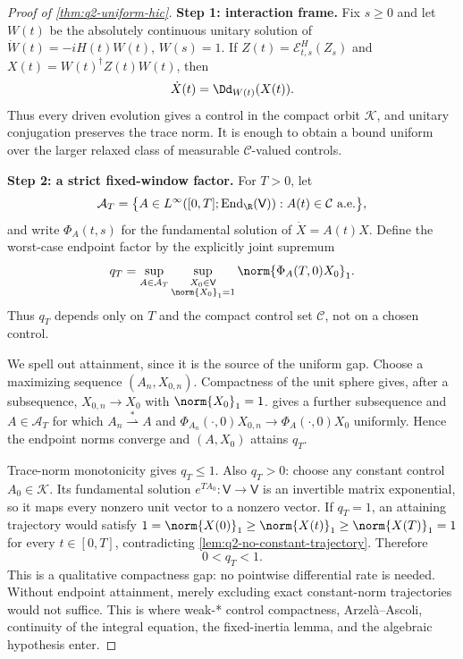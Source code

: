 \documentclass[class=article,11pt,a4paper,crop=false]{standalone}
\begin{document}
\begin{proof}[Proof of \cref{thm:q2-uniform-hic}]
\textbf{Step 1: interaction frame.}
Fix $s\ge0$ and let $W(t)$ be the absolutely continuous unitary solution of
$\dot W(t)=-iH(t)W(t)$, $W(s)=1$. If
$Z(t)=\mathcal E^H_{t,s}(Z_s)$ and $X(t)=W(t)^\dagger Z(t)W(t)$, then
\begin{equation}
  \dot X(t)=\Dd_{W(t)}(X(t)).
  \label{eq:q2-interaction-frame}
\end{equation}
Thus every driven evolution gives a control in the compact orbit
$\mathcal K$, and unitary conjugation preserves the trace norm. It is enough
to obtain a bound uniform over the larger relaxed class of measurable
$\mathcal C$-valued controls.

\textbf{Step 2: a strict fixed-window factor.}
For $T>0$, let
\begin{equation}
 \mathcal A_T=\big\{A\in L^\infty([0,T];
 \operatorname{End}_{\R}(\mathsf V)):A(t)\in\mathcal C\text{ a.e.}\big\},
\end{equation}
and write $\Phi_A(t,s)$ for the fundamental solution of $\dot X=A(t)X$.
Define the worst-case endpoint factor by the explicitly joint supremum
\begin{equation}
 q_T=\sup_{A\in\mathcal A_T}
     \sup_{\substack{X_0\in\mathsf V\\ \norm{X_0}_1=1}}
     \norm{\Phi_A(T,0)X_0}_1.
 \label{eq:q2-window-factor}
\end{equation}
Thus $q_T$ depends only on $T$ and the compact control set $\mathcal C$, not
on a chosen control.

We spell out attainment, since it is the source of the uniform gap. Choose a
maximizing sequence $(A_n,X_{0,n})$. Compactness of the unit sphere gives,
after a subsequence, $X_{0,n}\to X_0$ with $\norm{X_0}_1=1$.
 gives a further subsequence and
$A\in\mathcal A_T$ for which $A_n\stackrel{*}{\rightharpoonup}A$ and
$\Phi_{A_n}(\cdot,0)X_{0,n}\to\Phi_A(\cdot,0)X_0$ uniformly. Hence the
endpoint norms converge and $(A,X_0)$ attains $q_T$.

Trace-norm monotonicity gives $q_T\le1$. Also $q_T>0$: choose any constant
control $A_0\in\mathcal K$. Its fundamental solution
$e^{TA_0}:\mathsf V\to\mathsf V$ is an invertible matrix exponential, so it
maps every nonzero unit vector to a nonzero vector. If $q_T=1$, an attaining
trajectory would satisfy
$1=\norm{X(0)}_1\ge\norm{X(t)}_1\ge\norm{X(T)}_1=1$ for every
$t\in[0,T]$, contradicting \cref{lem:q2-no-constant-trajectory}. Therefore
\begin{equation}
  0<q_T<1.
  \label{eq:q2-q-strict}
\end{equation}
This is a qualitative compactness gap: no pointwise differential rate is
needed. Without endpoint attainment, merely excluding exact constant-norm
trajectories would not suffice. This is where weak-* control compactness,
Arzel\`a--Ascoli, continuity of the integral equation, the fixed-inertia
lemma, and the algebraic hypothesis enter.


\end{proof}
\end{document}
